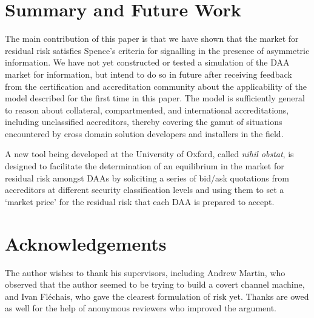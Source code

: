 \documentclass{llncs}
\begin{document}
\section{Summary and Future Work}

The main contribution of this paper is that we have shown that the market for
residual risk satisfies Spence's criteria for signalling in the presence of
asymmetric information.  We have not yet constructed or tested a simulation
of the DAA market for information, but intend to do so in future after
receiving feedback from the certification and accreditation community about the
applicability of the model described for the first time in this paper.  The
model is sufficiently general to reason about collateral, compartmented, and
international accreditations, including unclassified accreditors, thereby
covering the gamut of situations encountered by cross domain solution developers
and installers in the field.

A new tool being developed at the University of Oxford, called {\it nihil obstat},
is designed to facilitate the determination of an equilibrium in the market for
residual risk amongst DAAs by soliciting a series of bid/ask quotations from
accreditors at different security classification levels and using them to set a
`market price' for the residual risk that each DAA is prepared to accept.


\section*{Acknowledgements}

The author wishes to thank his supervisors, including Andrew Martin, who observed
that the author seemed to be trying to build a covert channel machine, and Ivan
Fl\'echais, who gave the clearest formulation of risk yet.  Thanks are owed as
well for the help of anonymous reviewers who improved the argument.


\end{document}
